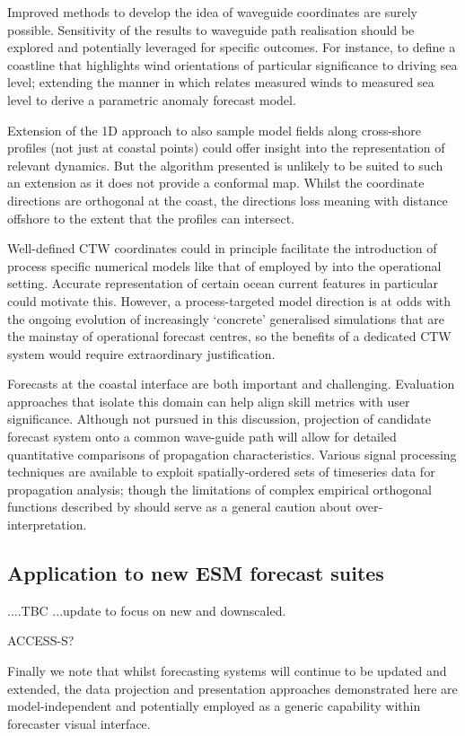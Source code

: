 Improved methods to develop the idea of waveguide coordinates are surely possible.
Sensitivity of the results to waveguide path realisation should be explored and potentially leveraged for specific outcomes.
For instance, to define a coastline that highlights wind orientations of particular significance to driving sea level; extending the manner in which \citet{Tilburg:2004cg} relates measured winds to measured sea level to derive a parametric anomaly forecast model. 


Extension of the 1D approach to also sample model fields along cross-shore profiles (not just at coastal points) could offer insight into the representation of relevant dynamics.
But the algorithm presented is unlikely to be suited to such an extension as it does not provide a conformal map.  Whilst the coordinate directions are orthogonal at the coast, the directions loss meaning with distance offshore to the extent that the profiles can intersect.
  


Well-defined CTW coordinates could in principle facilitate the introduction of process specific numerical models like that of \citet{Brink:1987va} employed by \citet{Liao:2018jd} into the operational setting.
Accurate representation of certain ocean current features in particular could motivate this. 
However, a process-targeted model direction is at odds with the ongoing evolution of increasingly `concrete' generalised simulations \citep{Petersen:2012tr} that are the mainstay of operational forecast centres, so the benefits of a dedicated CTW system would require extraordinary justification.

Forecasts at the coastal interface are both important and challenging. Evaluation approaches that isolate this domain can help align skill metrics with user significance.  
Although not pursued in this discussion, projection of candidate forecast system onto a common wave-guide path will allow for detailed quantitative comparisons of propagation characteristics.  Various signal processing techniques are available to exploit spatially-ordered sets of timeseries data for propagation analysis; though the limitations of complex empirical orthogonal functions described by \citet{Merrifield:1990um} should serve as a general caution about over-interpretation.   


\subsection{ Application to new ESM forecast suites}
....TBC ...update to focus on new and downscaled.


ACCESS-S?



Finally we note that whilst forecasting systems will continue to be updated and extended, the data projection and presentation approaches demonstrated here are model-independent and potentially employed as a generic capability within forecaster visual interface.




